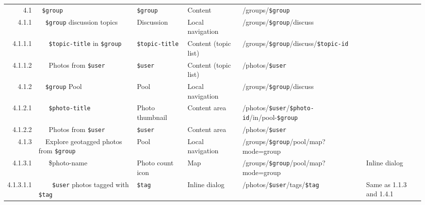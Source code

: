 \documentclass[11pt,a4paper]{article}
\newcommand{\var}[1]{\texttt{\${#1}}}
\begin{document}
\begin{landscape}
\begin{table}[h!b!p!]
\begin{center}
\begin{tiny}
\begin{tabular}{r|l|l|l|l|p{3cm}}
              4.1 &
              ~\var{group} &
              \var{group} &
              Content &
              /groups/\var{group} &
              \\

                4.1.1 &
                ~~\var{group} discussion topics &
                Discussion &
                Local navigation &
                /groups/\var{group}/discuss &
                \\

                  4.1.1.1 &
                  ~~~\var{topic-title} in \var{group} &
                  \var{topic-title} &
                  Content (topic list) &
                  /groups/\var{group}/discuss/\var{topic-id} &
                  \\

                  4.1.1.2 &
                  ~~~Photos from \var{user} &
                  \var{user} &
                  Content (topic list) &
                  /photos/\var{user} &
                  \\

                4.1.2 &
                ~~\var{group} Pool &
                Pool &
                Local navigation &
                /groups/\var{group}/discuss &
                \\

                  4.1.2.1 &
                  ~~~\var{photo-title} &
                  Photo thumbnail &
                  Content area &
                  /photos/\var{user}/\var{photo-id}/in/pool-\var{group} &
                  \\

                  4.1.2.2 &
                  ~~~Photos from \var{user} &
                  \var{user} &
                  Content area &
                  /photos/\var{user} &
                  \\

                4.1.3 &
                ~~Explore geotagged photos from \var{group}  &
                Pool &
                Local navigation &
                /groups/\var{group}/pool/map?mode=group &
                \\

                  4.1.3.1 &
                  ~~~\$photo-name &
                  Photo count icon &
                  Map &
                  /groups/\var{group}/pool/map?mode=group &
                  Inline dialog\\

                    4.1.3.1.1 &
                    ~~~~\var{user} photos tagged with \var{tag} &
                    \var{tag} &
                    Inline dialog &
                    /photos/\var{user}/tags/\var{tag} &
                    Same as 1.1.3 and 1.4.1\\


\end{tabular}
\end{tiny}
\end{center}
\end{table}
\end{landscape}
\end{document}
